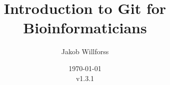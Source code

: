 \documentclass[12pt]{report}
\begin{document}
\title{Introduction to Git for Bioinformaticians}
\author{Jakob Willforss}
\date{\today\\v1.3.1}
\maketitle

\renewcommand{\bibname}{References}

\setcounter{tocdepth}{2}
\tableofcontents












\end{document}
